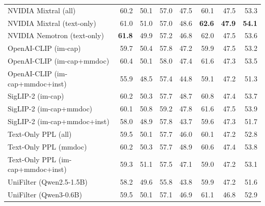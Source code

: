 \begin{table}
\begin{tabular}{lrrrrrrr}
NVIDIA Mixtral (all) & 60.2 & 50.1 & 57.0 & 47.5 & 60.1 & 47.5 & 53.3 \\
NVIDIA Mixtral (text-only) & 61.0 & 51.0 & 57.0 & 48.6 & \textbf{62.6} & \textbf{47.9} & \textbf{54.1} \\
NVIDIA Nemotron (text-only) & \textbf{61.8} & 49.9 & 57.2 & 46.8 & 62.0 & 47.5 & 53.6 \\
OpenAI-CLIP (im-cap) & 59.7 & 50.4 & 57.8 & 47.2 & 59.9 & 47.5 & 53.2 \\
OpenAI-CLIP (im-cap+mmdoc) & 60.4 & 50.1 & 58.0 & 47.4 & 61.6 & 47.3 & 53.5 \\
OpenAI-CLIP (im-cap+mmdoc+inst) & 55.9 & 48.5 & 57.4 & 44.8 & 59.1 & 47.2 & 51.3 \\
SigLIP-2 (im-cap) & 60.2 & 50.3 & 57.7 & 48.7 & 60.8 & 47.4 & 53.7 \\
SigLIP-2 (im-cap+mmdoc) & 60.1 & 50.8 & 59.2 & 47.8 & 61.6 & 47.5 & 53.9 \\
SigLIP-2 (im-cap+mmdoc+inst) & 58.0 & 48.9 & 57.8 & 43.7 & 59.6 & 47.3 & 51.7 \\
Text-Only PPL (all) & 59.5 & 50.1 & 57.7 & 46.0 & 60.1 & 47.2 & 52.8 \\
Text-Only PPL (mmdoc) & 60.2 & 50.3 & 57.7 & 48.9 & 60.6 & 47.4 & 53.8 \\
Text-Only PPL (im-cap+mmdoc+inst) & 59.3 & 51.1 & 57.5 & 47.1 & 59.0 & 47.2 & 53.1 \\
UniFilter (Qwen2.5-1.5B) & 58.2 & 49.6 & 55.8 & 43.8 & 59.9 & 47.2 & 51.6 \\
UniFilter (Qwen3-0.6B) & 59.5 & 50.1 & 57.1 & 46.9 & 61.1 & 46.8 & 52.9 \\
\bottomrule
\end{tabular}
\end{table}
